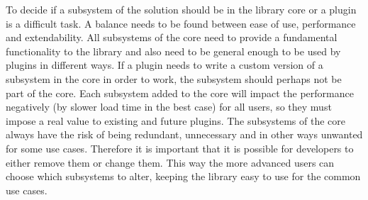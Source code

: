 \documentclass[a4paper,11pt]{kth-mag}
\begin{document}

      To decide if a subsystem of the solution should be in the library core or a plugin is a difficult task.
      A balance needs to be found between ease of use, performance and extendability.
      All subsystems of the core need to provide a fundamental functionality to the library and also need to be general enough to be used by plugins in different ways.
      If a plugin needs to write a custom version of a subsystem in the core in order to work, the subsystem should perhaps not be part of the core.
      Each subsystem added to the core will impact the performance negatively (by slower load time in the best case) for all users, so they must impose a real value to existing and future plugins.
      The subsystems of the core always have the risk of being redundant, unnecessary and in other ways unwanted for some use cases.
      Therefore it is important that it is possible for developers to either remove them or change them.
      This way the more advanced users can choose which subsystems to alter, keeping the library easy to use for the common use cases.

      
\end{document}
